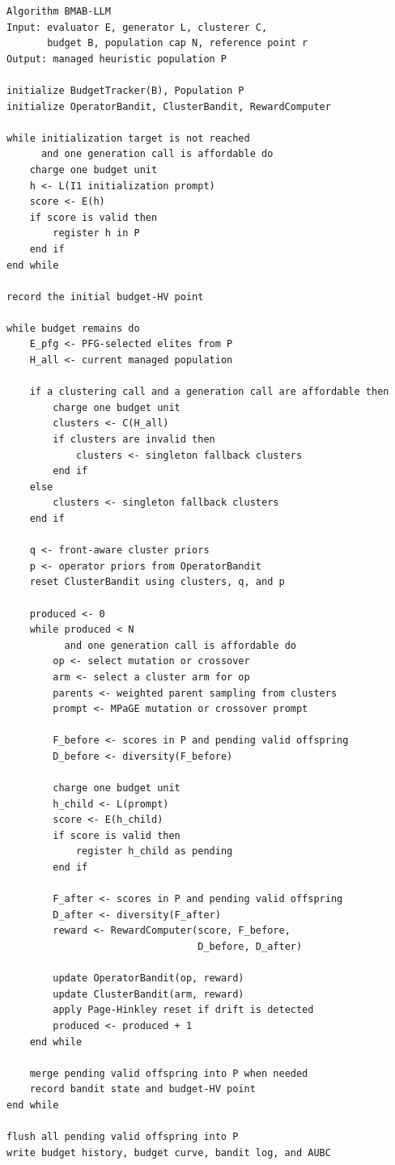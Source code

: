 \begin{lstlisting}[language={},caption={High-level BMAB-LLM workflow.},label={lst:bmab-algorithm}]
Algorithm BMAB-LLM
Input: evaluator E, generator L, clusterer C,
       budget B, population cap N, reference point r
Output: managed heuristic population P

initialize BudgetTracker(B), Population P
initialize OperatorBandit, ClusterBandit, RewardComputer

while initialization target is not reached
      and one generation call is affordable do
    charge one budget unit
    h <- L(I1 initialization prompt)
    score <- E(h)
    if score is valid then
        register h in P
    end if
end while

record the initial budget-HV point

while budget remains do
    E_pfg <- PFG-selected elites from P
    H_all <- current managed population

    if a clustering call and a generation call are affordable then
        charge one budget unit
        clusters <- C(H_all)
        if clusters are invalid then
            clusters <- singleton fallback clusters
        end if
    else
        clusters <- singleton fallback clusters
    end if

    q <- front-aware cluster priors
    p <- operator priors from OperatorBandit
    reset ClusterBandit using clusters, q, and p

    produced <- 0
    while produced < N
          and one generation call is affordable do
        op <- select mutation or crossover
        arm <- select a cluster arm for op
        parents <- weighted parent sampling from clusters
        prompt <- MPaGE mutation or crossover prompt

        F_before <- scores in P and pending valid offspring
        D_before <- diversity(F_before)

        charge one budget unit
        h_child <- L(prompt)
        score <- E(h_child)
        if score is valid then
            register h_child as pending
        end if

        F_after <- scores in P and pending valid offspring
        D_after <- diversity(F_after)
        reward <- RewardComputer(score, F_before,
                                 D_before, D_after)

        update OperatorBandit(op, reward)
        update ClusterBandit(arm, reward)
        apply Page-Hinkley reset if drift is detected
        produced <- produced + 1
    end while

    merge pending valid offspring into P when needed
    record bandit state and budget-HV point
end while

flush all pending valid offspring into P
write budget history, budget curve, bandit log, and AUBC
\end{lstlisting}

